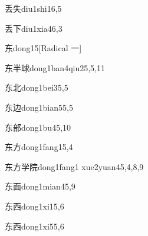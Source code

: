 \begin{entry}{丢失}{diu1shi1}{6,5}
\end{entry}

\begin{entry}{丢下}{diu1xia4}{6,3}
\end{entry}

\begin{entry}{东}{dong1}{5}[Radical ⼀]
\end{entry}

\begin{entry}{东半球}{dong1ban4qiu2}{5,5,11}
\end{entry}

\begin{entry}{东北}{dong1bei3}{5,5}
\end{entry}

\begin{entry}{东边}{dong1bian5}{5,5}
\end{entry}

\begin{entry}{东部}{dong1bu4}{5,10}
\end{entry}

\begin{entry}{东方}{dong1fang1}{5,4}
\end{entry}

\begin{entry}{东方学院}{dong1fang1 xue2yuan4}{5,4,8,9}
\end{entry}

\begin{entry}{东面}{dong1mian4}{5,9}
\end{entry}

\begin{entry}{东西}{dong1xi1}{5,6}
\end{entry}

\begin{entry}{东西}{dong1xi5}{5,6}
\end{entry}

